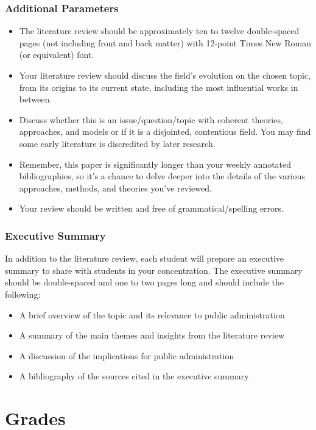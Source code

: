 \documentclass[12pt, letterpaper]{article}
\begin{document}
\subsubsection*{Additional Parameters}
    \begin{itemize}
        \item The literature review should be approximately ten to twelve double-spaced pages (not including front and back matter) with 12-point Times New Roman (or equivalent) font.
        \item Your literature review should discuss the field’s evolution on the chosen topic, from its origins to its current state, including the most influential works in between.
        \item Discuss whether this is an issue/question/topic with coherent theories, approaches, and models or if it is a disjointed, contentious field. You may find some early literature is discredited by later research.
        \item Remember, this paper is significantly longer than your weekly annotated bibliographies, so it’s a chance to delve deeper into the details of the various approaches, methods, and theories you’ve reviewed.
        \item Your review should be written and free of grammatical/spelling errors.
    \end{itemize}   

\subsubsection*{Executive Summary}
In addition to the literature review, each student will prepare an executive summary to share with students in your concentration. The executive summary should be double-spaced and one to two pages long and should include the following:
    \begin{itemize}
        \item A brief overview of the topic and its relevance to public administration
        \item A summary of the main themes and insights from the literature review
        \item A discussion of the implications for public administration
        \item A bibliography of the sources cited in the executive summary
    \end{itemize}

\section{Grades}
\end{document}

